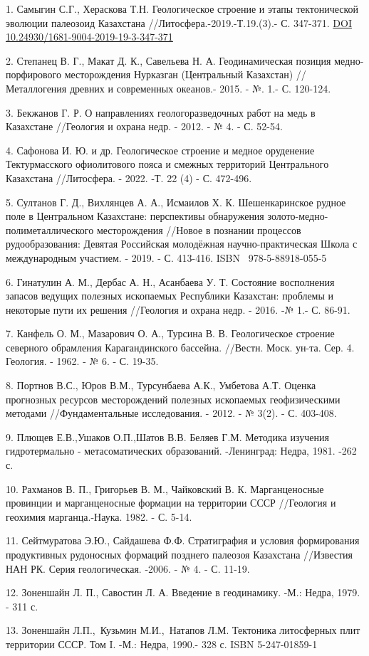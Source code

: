 \begin{references}
1. Самыгин С.Г., Хераскова Т.Н. Геологическое строение и этапы
тектонической эволюции палеозоид Казахстана
//Литосфера.-2019.-Т.19.(3).- С. 347-371.
\href{https://doi.org/10.24930/1681-9004-2019-19-3-347-371}{DOI
10.24930/1681-9004-2019-19-3-347-371}

2. Степанец В. Г., Макат Д. К., Савельева Н. А. Геодинамическая позиция
медно-порфирового месторождения Нурказган (Центральный Казахстан)
//Металлогения древних и современных океанов.- 2015. - №. 1.- С.
120-124.

3. Бекжанов Г. Р. О направлениях геологоразведочных работ на медь в
Казахстане //Геология и охрана недр. - 2012. - № 4. - С. 52-54.

4. Сафонова И. Ю. и др. Геологическое строение и медное оруденение
Тектурмасского офиолитового пояса и смежных территорий Центрального
Казахстана //Литосфера. - 2022. -Т. 22 (4) - С. 472-496.

5. Султанов Г. Д., Вихлянцев А. А., Исмаилов Х. К. Шешенкаринское рудное
поле в Центральном Казахстане: перспективы обнаружения
золото-медно-полиметаллического месторождения //Новое в познании
процессов рудообразования: Девятая Российская молодёжная
научно-практическая Школа с международным участием. - 2019. - С.
413-416. ISBN ~978-5-88918-055-5

6. Гинатулин А. М., Дербас А. Н., Асанбаева У. Т. Состояние восполнения
запасов ведущих полезных ископаемых Республики Казахстан: проблемы и
некоторые пути их решения //Геология и охрана недр. - 2016. -№ 1.- С.
86-91.

7. Канфель О. М., Мазарович О. А., Турсина В. В. Геологическое строение
северного обрамления Карагандинского бассейна. //Вестн. Моск. ун-та.
Сер. 4. Геология. - 1962. - № 6. - С. 19-35.

8. Портнов В.С., Юров В.М., Турсунбаева А.К., Умбетова А.Т. Оценка
прогнозных ресурсов месторождений полезных ископаемых геофизическими
методами //Фундаментальные исследования. - 2012. - № 3(2). - С. 403-408.

9. Плющев Е.В.,Ушаков О.П.,Шатов В.В. Беляев Г.М. Методика изучения
гидротермально - метасоматических образований. -Ленинград: Недра, 1981.
-262 с.

10. Рахманов В. П., Григорьев В. М., Чайковский В. К. Марганценосные
провинции и марганценосные формации на территории СССР //Геология и
геохимия марганца.-Наука. 1982. - С. 5-14.

11. Сейтмуратова Э.Ю., Сайдашева Ф.Ф. Стратиграфия и условия формирования
продуктивных рудоносных формаций позднего палеозоя Казахстана //Известия
НАН РК. Серия геологическая. -2006. - № 4. - С. 11-19.

12. Зоненшайн Л. П., Савостин Л. А. Введение в геодинамику. -М.: Недра,
1979. - 311 с.

13. Зоненшайн Л.П.,~Кузьмин М.И.,~Натапов Л.М. Тектоника литосферных плит
территории СССР. Том I. -М.: Недра, 1990.- 328 с. ISBN 5-247-01859-1
\end{references}

